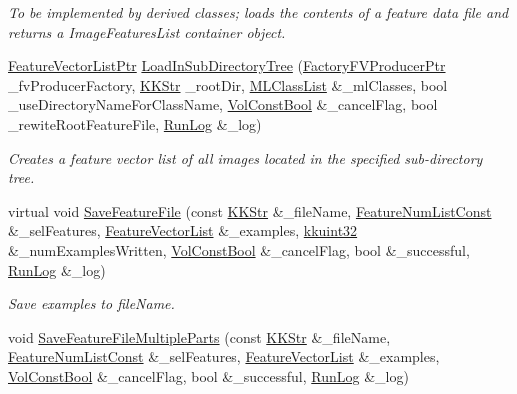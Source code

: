 \begin{DoxyCompactItemize}
\begin{DoxyCompactList}\small\item\em To be implemented by derived classes; loads the contents of a feature data file and returns a Image\+Features\+List container object. \end{DoxyCompactList}\item 
\hyperlink{namespace_k_k_m_l_l_acf2ba92a3cf03e2b19674b24ff488ef6}{Feature\+Vector\+List\+Ptr} \hyperlink{class_k_k_m_l_l_1_1_feature_file_i_o_abce09712a763ba49bf0cc55d0fdae784}{Load\+In\+Sub\+Directory\+Tree} (\hyperlink{namespace_k_k_m_l_l_a82812d1feb85a6cff72d059bc67bb90e}{Factory\+F\+V\+Producer\+Ptr} \+\_\+fv\+Producer\+Factory, \hyperlink{class_k_k_b_1_1_k_k_str}{K\+K\+Str} \+\_\+root\+Dir, \hyperlink{class_k_k_m_l_l_1_1_m_l_class_list}{M\+L\+Class\+List} \&\+\_\+ml\+Classes, bool \+\_\+use\+Directory\+Name\+For\+Class\+Name, \hyperlink{namespace_k_k_b_a7d390f568e2831fb76b86b56c87bf92f}{Vol\+Const\+Bool} \&\+\_\+cancel\+Flag, bool \+\_\+rewite\+Root\+Feature\+File, \hyperlink{class_k_k_b_1_1_run_log}{Run\+Log} \&\+\_\+log)
\begin{DoxyCompactList}\small\item\em Creates a feature vector list of all images located in the specified sub-\/directory tree. \end{DoxyCompactList}\item 
virtual void \hyperlink{class_k_k_m_l_l_1_1_feature_file_i_o_ab4ad6c5a641f1f8f7c72c1be98bc1da8}{Save\+Feature\+File} (const \hyperlink{class_k_k_b_1_1_k_k_str}{K\+K\+Str} \&\+\_\+file\+Name, \hyperlink{namespace_k_k_m_l_l_ad276a9ed309552a63300bce930bdfebd}{Feature\+Num\+List\+Const} \&\+\_\+sel\+Features, \hyperlink{class_k_k_m_l_l_1_1_feature_vector_list}{Feature\+Vector\+List} \&\+\_\+examples, \hyperlink{namespace_k_k_b_af8d832f05c54994a1cce25bd5743e19a}{kkuint32} \&\+\_\+num\+Examples\+Written, \hyperlink{namespace_k_k_b_a7d390f568e2831fb76b86b56c87bf92f}{Vol\+Const\+Bool} \&\+\_\+cancel\+Flag, bool \&\+\_\+successful, \hyperlink{class_k_k_b_1_1_run_log}{Run\+Log} \&\+\_\+log)
\begin{DoxyCompactList}\small\item\em Save examples to \textquotesingle{}file\+Name\textquotesingle{}. \end{DoxyCompactList}\item 
void \hyperlink{class_k_k_m_l_l_1_1_feature_file_i_o_a56dd8e3853e6e14f1c966dab94460681}{Save\+Feature\+File\+Multiple\+Parts} (const \hyperlink{class_k_k_b_1_1_k_k_str}{K\+K\+Str} \&\+\_\+file\+Name, \hyperlink{namespace_k_k_m_l_l_ad276a9ed309552a63300bce930bdfebd}{Feature\+Num\+List\+Const} \&\+\_\+sel\+Features, \hyperlink{class_k_k_m_l_l_1_1_feature_vector_list}{Feature\+Vector\+List} \&\+\_\+examples, \hyperlink{namespace_k_k_b_a7d390f568e2831fb76b86b56c87bf92f}{Vol\+Const\+Bool} \&\+\_\+cancel\+Flag, bool \&\+\_\+successful, \hyperlink{class_k_k_b_1_1_run_log}{Run\+Log} \&\+\_\+log)

\end{DoxyCompactItemize}
